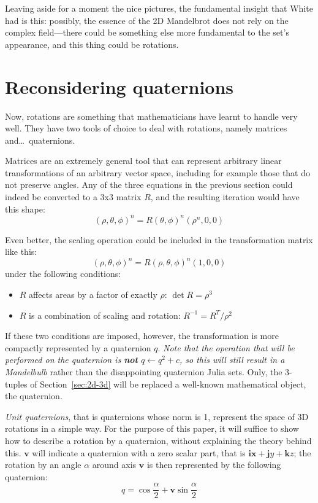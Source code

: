 \documentclass{article}
\let\vec\mathbf
\begin{document}
Leaving aside for a moment the nice pictures, the fundamental insight
that White had is this: possibly, the essence of the 2D Mandelbrot does
not rely on the complex field---there could be something else more
fundamental to the set's appearance, and this thing could be rotations.

\section{Reconsidering quaternions}
\label{sec:quaternions}

Now, rotations are something that mathematicians have learnt to handle
very well.  They have two tools of choice to deal with rotations, namely
matrices and\dots\ quaternions.

Matrices are an extremely general tool that can represent arbitrary
linear transformations of an arbitrary vector space, including for
example those that do not preserve angles.  Any of the three equations
in the previous section could indeed be converted to a 3x3 matrix $R$,
and the resulting iteration would have this shape:
\begin{equation*}
  (\rho,\theta,\phi)^n = R(\theta,\phi)^n (\rho^n,0,0)
\end{equation*}

\noindent
Even better, the scaling operation could be included in the transformation
matrix like this:
\begin{equation*}
  (\rho,\theta,\phi)^n = R(\rho,\theta,\phi)^n (1,0,0)
\end{equation*}
\noindent
under the following conditions:
\begin{itemize}
\item $R$ affects areas by a factor of exactly $\rho$: $\det R = \rho^3$
\item $R$ is a combination of scaling and rotation: $R^{-1} = R^T / \rho^2$
\end{itemize}

If these two conditions are imposed, however, the transformation is
more compactly represented by a quaternion $q$.  \emph{Note that the
  operation that will be performed on the quaternion is \textbf{not}
  $q\leftarrow q^2+c$, so this will still result in a Mandelbulb}
rather than the disappointing quaternion Julia sets.  Only, the
3-tuples of Section~\ref{sec:2d-3d} will be replaced a well-known
mathematical object, the quaternion.

\emph{Unit quaternions}, that is quaternions whose norm is 1, represent
the space of 3D rotations in a simple way.  For the purpose of this paper,
it will suffice to show how to describe a rotation by a quaternion,
without explaining the theory behind this.  $\vec{v}$ will indicate a
quaternion with a zero scalar part, that is $\vec{ix}+\vec{j}y+\vec{k}z$;
the rotation by an angle $\alpha$ around axis $\vec{v}$ is then
represented by the following quaternion:
\begin{equation*}
q = \cos \frac\alpha2 + \vec{v} \sin \frac\alpha2
\end{equation*}
\end{document}
